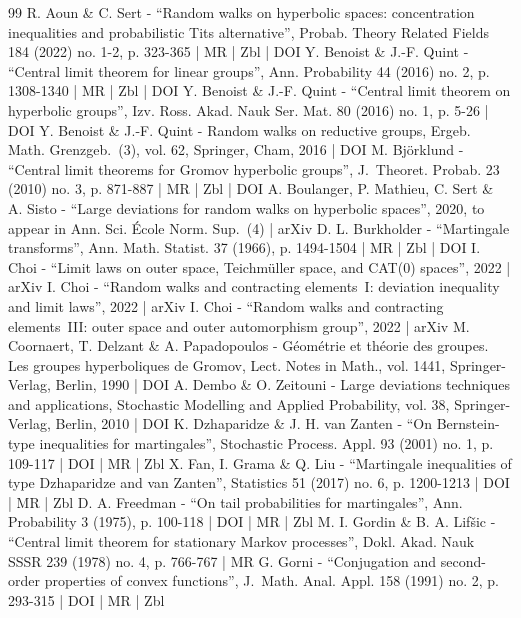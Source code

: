 \documentclass[10pt]{amsart}
\theoremstyle{plain}
\theoremstyle{definition}
\begin{document}
\begin{thebibliography}{99}
R. Aoun \& C. Sert - “Random walks on hyperbolic spaces: concentration inequalities and probabilistic Tits alternative”, Probab. Theory Related Fields 184 (2022) no. 1-2, p. 323-365 | MR | Zbl | DOI
Y. Benoist \& J.-F. Quint - “Central limit theorem for linear groups”, Ann. Probability 44 (2016) no. 2, p. 1308-1340 | MR | Zbl | DOI
Y. Benoist \& J.-F. Quint - “Central limit theorem on hyperbolic groups”, Izv. Ross. Akad. Nauk Ser. Mat. 80 (2016) no. 1, p. 5-26 | DOI
Y. Benoist \& J.-F. Quint - Random walks on reductive groups, Ergeb. Math. Grenzgeb. (3), vol. 62, Springer, Cham, 2016 | DOI
M. Björklund - “Central limit theorems for Gromov hyperbolic groups”, J. Theoret. Probab. 23 (2010) no. 3, p. 871-887 | MR | Zbl | DOI
A. Boulanger, P. Mathieu, C. Sert \& A. Sisto - “Large deviations for random walks on hyperbolic spaces”, 2020, to appear in Ann. Sci. École Norm. Sup. (4) | arXiv
D. L. Burkholder - “Martingale transforms”, Ann. Math. Statist. 37 (1966), p. 1494-1504 | MR | Zbl | DOI
I. Choi - “Limit laws on outer space, Teichmüller space, and CAT(0) spaces”, 2022 | arXiv
I. Choi - “Random walks and contracting elements I: deviation inequality and limit laws”, 2022 | arXiv
I. Choi - “Random walks and contracting elements III: outer space and outer automorphism group”, 2022 | arXiv
M. Coornaert, T. Delzant \& A. Papadopoulos - Géométrie et théorie des groupes. Les groupes hyperboliques de Gromov, Lect. Notes in Math., vol. 1441, Springer-Verlag, Berlin, 1990 | DOI
A. Dembo \& O. Zeitouni - Large deviations techniques and applications, Stochastic Modelling and Applied Probability, vol. 38, Springer-Verlag, Berlin, 2010 | DOI
K. Dzhaparidze \& J. H. van Zanten - “On Bernstein-type inequalities for martingales”, Stochastic Process. Appl. 93 (2001) no. 1, p. 109-117 | DOI | MR | Zbl
X. Fan, I. Grama \& Q. Liu - “Martingale inequalities of type Dzhaparidze and van Zanten”, Statistics 51 (2017) no. 6, p. 1200-1213 | DOI | MR | Zbl
D. A. Freedman - “On tail probabilities for martingales”, Ann. Probability 3 (1975), p. 100-118 | DOI | MR | Zbl
M. I. Gordin \& B. A. Lifšic - “Central limit theorem for stationary Markov processes”, Dokl. Akad. Nauk SSSR 239 (1978) no. 4, p. 766-767 | MR
G. Gorni - “Conjugation and second-order properties of convex functions”, J. Math. Anal. Appl. 158 (1991) no. 2, p. 293-315 | DOI | MR | Zbl

\end{thebibliography}
\end{document}
